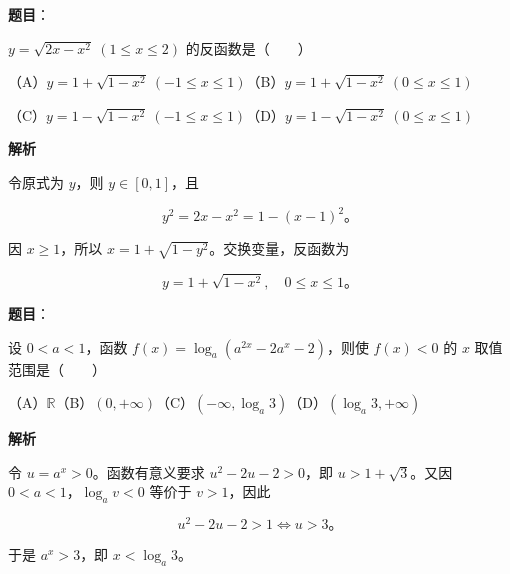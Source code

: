 \begin{answer}

\textbf{题目}：

$y=\sqrt{2x-x^2}\ (1\leqslant x\leqslant2)$ 的反函数是\mbox{（　　）}

（A）$y=1+\sqrt{1-x^2}\ (-1\leqslant x\leqslant1)$\quad（B）$y=1+\sqrt{1-x^2}\ (0\leqslant x\leqslant1)$

（C）$y=1-\sqrt{1-x^2}\ (-1\leqslant x\leqslant1)$\quad（D）$y=1-\sqrt{1-x^2}\ (0\leqslant x\leqslant1)$

\textbf{解析}

令原式为 $y$，则 $y\in[0,1]$，且

\nopagebreak[4]
\[
y^2=2x-x^2=1-(x-1)^2\text{。}
\]

因 $x\geqslant1$，所以 $x=1+\sqrt{1-y^2}$。交换变量，反函数为

\nopagebreak[4]
\[
y=1+\sqrt{1-x^2},\quad 0\leqslant x\leqslant1\text{。}
\]


\end{answer}
\begin{answer}

\textbf{题目}：

设 $0<a<1$，函数 $f(x)=\log_a(a^{2x}-2a^x-2)$，则使 $f(x)<0$ 的 $x$ 取值范围是\mbox{（　　）}

（A）$\mathbb R$\quad（B）$(0,+\infty)$\quad（C）$(-\infty,\log_a3)$\quad（D）$(\log_a3,+\infty)$

\textbf{解析}

令 $u=a^x>0$。函数有意义要求 $u^2-2u-2>0$，即 $u>1+\sqrt3$。又因 $0<a<1$，$\log_a v<0$ 等价于 $v>1$，因此

\nopagebreak[4]
\[
u^2-2u-2>1
\Longleftrightarrow u>3\text{。}
\]

于是 $a^x>3$，即 $x<\log_a3$。


\end{answer}
